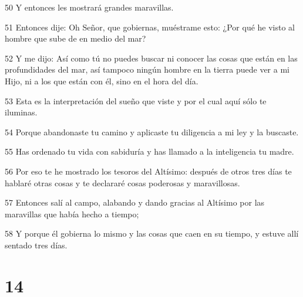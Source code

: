 \par 50 Y entonces les mostrará grandes maravillas.
\par 51 Entonces dije: Oh Señor, que gobiernas, muéstrame esto: ¿Por qué he visto al hombre que sube de en medio del mar?
\par 52 Y me dijo: Así como tú no puedes buscar ni conocer las cosas que están en las profundidades del mar, así tampoco ningún hombre en la tierra puede ver a mi Hijo, ni a los que están con él, sino en el hora del día.
\par 53 Esta es la interpretación del sueño que viste y por el cual aquí sólo te iluminas.
\par 54 Porque abandonaste tu camino y aplicaste tu diligencia a mi ley y la buscaste.
\par 55 Has ordenado tu vida con sabiduría y has llamado a la inteligencia tu madre.
\par 56 Por eso te he mostrado los tesoros del Altísimo: después de otros tres días te hablaré otras cosas y te declararé cosas poderosas y maravillosas.
\par 57 Entonces salí al campo, alabando y dando gracias al Altísimo por las maravillas que había hecho a tiempo;
\par 58 Y porque él gobierna lo mismo y las cosas que caen en su tiempo, y estuve allí sentado tres días.

\chapter{14}

